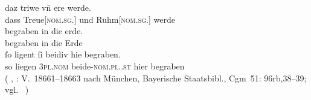 \begin{exe}
\ex \label{ex:beid2p2combrem}

		\gll daz triwe vn̄ ere werde. \\
			dass Treue[\textsc{nom.sg.\FemI}] und Ruhm[\textsc{nom.sg.\FemI}] werde \\
	\sn \gll begraben in die erde. \\
			begraben in die Erde \\
	\sn \gll ſo ligent ſi beidiv hie begraben. \\
			so liegen \textsc{3pl\subI.nom} beide-\textsc{nom.pl.\NeutI.st} hier
			begraben \\
		\trans {}
			(%
				, :
				V.~18661--18663 nach
				München, Bayerische Staatsbibl., Cgm~51: 96rb,38--39;
				vgl.~\cites[259]{maroldschroeder1969}[M342]{rem}%
			)%
	
\end{exe}

